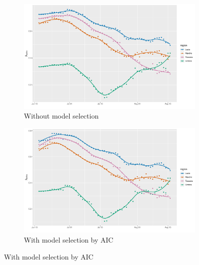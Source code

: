 \documentclass[12pt]{article}
\begin{document}
\begin{appendices}
		\begin{figure}[H]
    	    \centering
    	    \begin{subfigure}{\textwidth}
    	      \centering
    	      \includegraphics[width=0.92\linewidth]{output/model_within_lag14_betawithin_Centro (IT)_rolling.pdf}
    	      \caption{Without model selection}
    	      \label{fig:beta_within_over_time_centro_regular}
    	    \end{subfigure}\newline
    	    \begin{subfigure}{\textwidth}
    	      \centering
    	      \includegraphics[width=0.92\linewidth]{output/model_within_lag14_betawithin_Centro (IT)_aic_rolling.pdf}
    	      \caption{With model selection by AIC}
    	      \label{fig:beta_within_over_time_centro_aic}
    	    \end{subfigure}
    	\end{figure}
        \begin{figure}[H]\ContinuedFloat
    	    \begin{subfigure}{\textwidth}
    	      \centering

\end{subfigure}
\end{figure}
\end{appendices}
\end{document}
